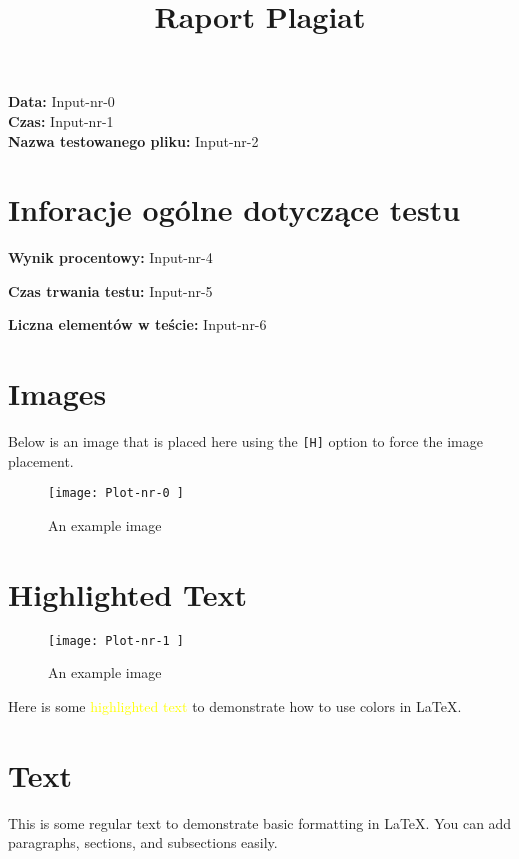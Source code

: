 \documentclass{article}
\title{Raport Plagiat}
\date{}
\begin{document}
\maketitle

\begin{center}
    \textbf{Data:} Input-nr-0 \\
    \textbf{Czas:} Input-nr-1 \\
    \textbf{Nazwa testowanego pliku:} Input-nr-2
\end{center}

\section{Inforacje ogólne dotyczące testu}

\textbf{Wynik procentowy:} \textcolor{Input-nr-3}{ Input-nr-4 }

\textbf{Czas trwania testu:} Input-nr-5

\textbf{Liczna elementów w teście:} Input-nr-6


\section{Images}

Below is an image that is placed here using the \texttt{[H]} option to force the image placement.

\begin{figure}[H]
\centering
\texttt{[image:  Plot-nr-0 ]}
\caption{An example image}
\end{figure}

\section{Highlighted Text}

\begin{figure}[H]
\centering
\texttt{[image:  Plot-nr-1 ]}
\caption{An example image}
\end{figure}


Here is some \textcolor{yellow}{highlighted text} to demonstrate how to use colors in LaTeX.

\section{Text}

This is some regular text to demonstrate basic formatting in LaTeX. You can add paragraphs, sections, and subsections easily.
\end{document}
